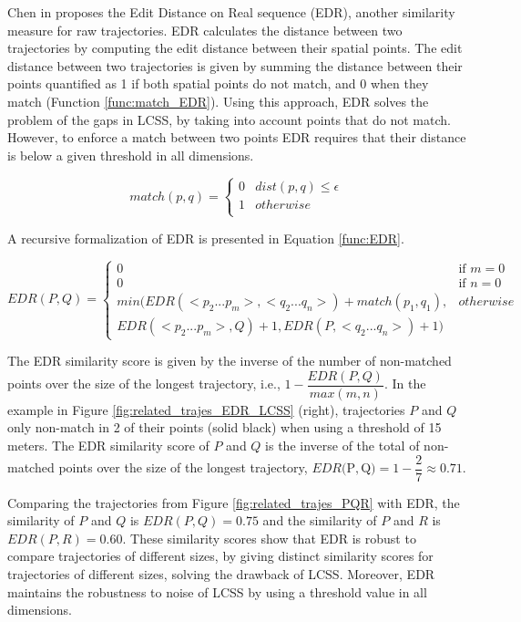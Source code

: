 \documentclass[12pt]{article}
\begin{document}
Chen in \cite{Chen:2005:RFS:1066157.1066213} proposes the Edit Distance on Real sequence (EDR), another similarity measure for raw trajectories. EDR calculates the distance between two trajectories by computing the edit distance between their spatial points. The edit distance between two trajectories is given by summing the distance between their points quantified as 1 if both spatial points do not match, and 0 when they match ({Function} \ref{func:match_EDR}). Using this approach, EDR solves the problem of the gaps in LCSS, by taking into account points that do not match. However, to enforce a match between two points EDR requires that their distance is below a given threshold in all dimensions.

\begin{equation}
\label{func:match_EDR}
  match(p, q) = 
  \begin{cases} 
      0 & dist(p, q) \leq \epsilon \\ 
      1 & otherwise\\
  \end{cases}
\end{equation}

A recursive  formalization of EDR is presented in Equation \ref{func:EDR}.

\begin{equation}
\label{func:EDR}
  EDR(P, Q) = 
  \begin{cases} 
      0 & \text{if } m = 0\\ 
      0 & \text{if } n = 0\\ 
      min(EDR(<p_2...p_m>,<q_2...q_n>) + match(p_1, q_1), & otherwise\\
      EDR(<p_2...p_m>, Q) + 1, EDR(P, <q_2...q_n>) + 1) &
  \end{cases}
\end{equation}

The EDR similarity score is given by the inverse of the number of non-matched points over the size of the longest trajectory, i.e., $1 - \dfrac{EDR(P, Q)}{max(m, n)}$. In the example in Figure \ref{fig:related_trajes_EDR_LCSS} (right), trajectories $P$ and $Q$ only non-match in 2 of their points (solid black) when using a threshold of 15 meters. The EDR similarity score of $P$ and $Q$ is the inverse of the total of non-matched points over the size of the longest trajectory, $EDR($P$, $Q$) = 1 - \dfrac{2}{7} \approx 0.71$.

Comparing the trajectories from Figure \ref{fig:related_trajes_PQR} with EDR, the similarity of $P$ and $Q$ is $EDR(P, Q) = 0.75$ and the similarity of $P$ and $R$ is $EDR(P, R) = 0.60$. These similarity scores show that EDR is robust to {compare trajectories of different sizes}, by giving distinct similarity scores for trajectories of different sizes, solving the drawback of LCSS. Moreover, EDR maintains the robustness to noise of LCSS by using a threshold value in all dimensions.
\end{document}
